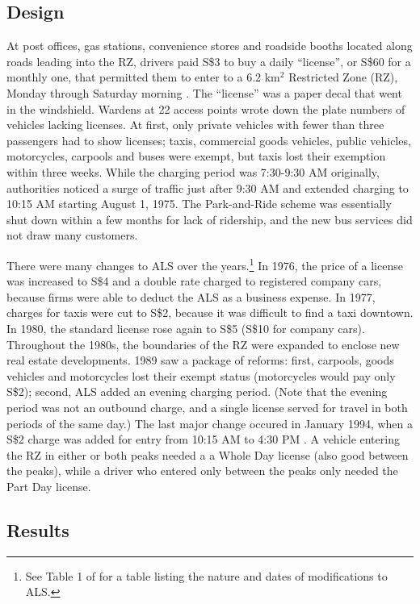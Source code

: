 \subsection{Design}

At post offices, gas stations, convenience stores and roadside booths located along roads leading into the RZ, drivers paid S\$3 to buy a daily ``license'', or S\$60 for a monthly one, that permitted them to enter to a 6.2 km$^{2}$ Restricted Zone (RZ), Monday through Saturday morning \citep{WatsonHolland1978}. The ``license'' was a paper decal that went in the windshield. Wardens at 22 access points wrote down the plate numbers of vehicles lacking licenses. At first, only private vehicles with fewer than three passengers had to show licenses; taxis, commercial goods vehicles, public vehicles, motorcycles, carpools and buses were exempt, but taxis lost their exemption within three weeks. While the charging period was 7:30-9:30 AM originally, authorities noticed a surge of traffic just after 9:30 AM and extended charging to 10:15 AM starting August 1, 1975. The Park-and-Ride scheme was essentially shut down within a few months for lack of ridership, and the new bus services did not draw many customers. 

There were many changes to ALS over the years.\footnote{See Table 1 of \citet[p. 98]{PhangToh1997} for a table listing the nature and dates of modifications to ALS. } In 1976, the price of a license was increased to S\$4 and a double rate charged to registered company cars, because firms were able to deduct the ALS as a business expense. In 1977, charges for taxis were cut to S\$2, because it was difficult to find a taxi downtown. In 1980, the standard license rose again to S\$5 (S\$10 for company cars). Throughout the 1980s, the boundaries of the RZ were expanded to enclose new real estate developments. 1989 saw a package of reforms: first, carpools, goods vehicles and motorcycles lost their exempt status (motorcycles would pay only S\$2); second, ALS added an evening charging period. (Note that the evening period was not an outbound charge, and a single license served for travel in both periods of the same day.) The last major change occured in January 1994, when a S\$2 charge was added for entry from 10:15 AM to 4:30 PM \citep{PhangToh2004}. A vehicle entering the RZ in either or both peaks needed a a Whole Day license (also good between the peaks), while a driver who entered only between the peaks only needed the Part Day license. 

\subsection{Results}

